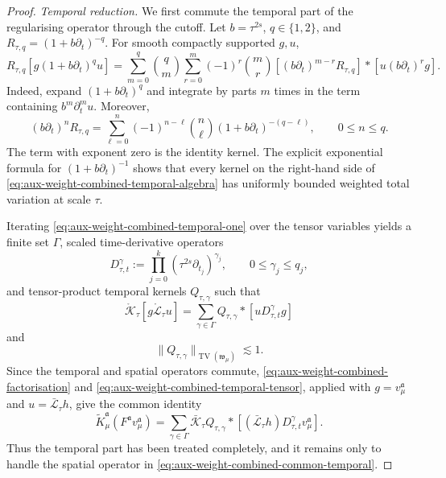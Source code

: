 \documentclass{article}
\numberwithin{equation}{section}
\newcommand{\assign}{:=}
\theoremstyle{plain}
\theoremstyle{definition}
\begin{document}
\begin{proof}
	\smallskip
	\noindent\emph{Temporal reduction.}
	We first commute the temporal part of the regularising operator through
	the cutoff. Let $b=\tau^{2s}$, $q\in\{1,2\}$, and
	$R_{\tau,q}=(1+b\partial_t)^{-q}$. For smooth compactly supported $g,u$,
	\begin{equation}
		\label{eq:aux-weight-combined-temporal-one}
		R_{\tau,q}[g(1+b\partial_t)^qu]
		=
		\sum_{m=0}^q\binom qm
		\sum_{r=0}^m(-1)^r\binom mr
		[(b\partial_t)^{m-r}R_{\tau,q}]*
		[u(b\partial_t)^rg].
	\end{equation}
	Indeed, expand $(1+b\partial_t)^q$ and integrate by parts $m$ times in
	the term containing $b^m\partial_t^m u$. Moreover,
	\begin{equation}
		\label{eq:aux-weight-combined-temporal-algebra}
		(b\partial_t)^nR_{\tau,q}
		=
		\sum_{\ell=0}^n
		(-1)^{n-\ell}\binom n\ell
		(1+b\partial_t)^{-(q-\ell)},
		\qquad 0\leqslant n\leqslant q.
	\end{equation}
	The term with exponent zero is the identity kernel. The explicit
	exponential formula for $(1+b\partial_t)^{-1}$ shows that every kernel on
	the right-hand side of
	\eqref{eq:aux-weight-combined-temporal-algebra} has uniformly bounded
	weighted total variation at scale $\tau$.
	
	Iterating \eqref{eq:aux-weight-combined-temporal-one} over the tensor
	variables yields a finite set $\Gamma$, scaled time-derivative operators
	\[
	D_{\tau,t}^{\gamma}
	\assign
	\prod_{j=0}^k
	(\tau^{2s}\partial_{t_j})^{\gamma_j},
	\qquad
	0\leqslant\gamma_j\leqslant q_j,
	\]
	and tensor-product temporal kernels $Q_{\tau,\gamma}$ such that
	\begin{equation}
		\label{eq:aux-weight-combined-temporal-tensor}
		\mathring{\mathcal K}_\tau
		[g\mathring{\mathcal L}_\tau u]
		=
		\sum_{\gamma\in\Gamma}
		Q_{\tau,\gamma}*[uD_{\tau,t}^{\gamma}g]
	\end{equation}
	and
	\begin{equation}
		\label{eq:aux-weight-combined-temporal-TV}
		\|Q_{\tau,\gamma}\|_{\operatorname{TV}(\mathfrak w_\mu)}
		\lesssim1.
	\end{equation}
	Since the temporal and spatial operators commute,
	\eqref{eq:aux-weight-combined-factorisation} and
	\eqref{eq:aux-weight-combined-temporal-tensor}, applied with
	$g=v_\mu^{\mathfrak a}$ and $u=\bar{\mathcal L}_\tau h$, give the common
	identity
	\begin{equation}
		\label{eq:aux-weight-combined-common-temporal}
		\tilde K_\mu^{\mathfrak a}
		(F^{\mathfrak a}v_\mu^{\mathfrak a})
		=
		\sum_{\gamma\in\Gamma}
		\bar{\mathcal K}_\tau Q_{\tau,\gamma}*
		[(\bar{\mathcal L}_\tau h)
		D_{\tau,t}^{\gamma}v_\mu^{\mathfrak a}].
	\end{equation}
	Thus the temporal part has been treated completely, and it remains only
	to handle the spatial operator in
	\eqref{eq:aux-weight-combined-common-temporal}.
	

\end{proof}
\end{document}
